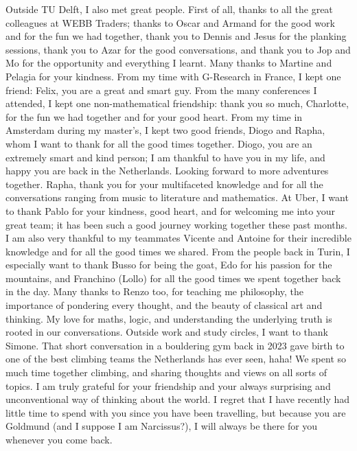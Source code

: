 Outside TU Delft, I also met great people. First of all, thanks to all the great colleagues at WEBB Traders; thanks to Oscar and Armand for the good work and for the fun we had together, thank you to Dennis and Jesus for the planking sessions, thank you to Azar for the good conversations, and thank you to Jop and Mo for the opportunity and everything I learnt. Many thanks to Martine and Pelagia for your kindness. From my time with G-Research in France, I kept one friend: Felix, you are a great and smart guy. From the many conferences I attended, I kept one non-mathematical friendship: thank you so much, Charlotte, for the fun we had together and for your good heart. From my time in Amsterdam during my master's, I kept two good friends, Diogo and Rapha, whom I want to thank for all the good times together. Diogo, you are an extremely smart and kind person; I am thankful to have you in my life, and happy you are back in the Netherlands. Looking forward to more adventures together. Rapha, thank you for your multifaceted knowledge and for all the conversations ranging from music to literature and mathematics. At Uber, I want to thank Pablo for your kindness, good heart, and for welcoming me into your great team; it has been such a good journey working together these past months. I am also very thankful to my teammates Vicente and Antoine for their incredible knowledge and for all the good times we shared. From the people back in Turin, I especially want to thank Busso for being the goat, Edo for his passion for the mountains, and Franchino (Lollo) for all the good times we spent together back in the day. Many thanks to Renzo too, for teaching me philosophy, the importance of pondering every thought, and the beauty of classical art and thinking. My love for maths, logic, and understanding the underlying truth is rooted in our conversations. Outside work and study circles, I want to thank Simone. That short conversation in a bouldering gym back in 2023 gave birth to one of the best climbing teams the Netherlands has ever seen, haha! We spent so much time together climbing, and sharing thoughts and views on all sorts of topics. I am truly grateful for your friendship and your always surprising and unconventional way of thinking about the world. I regret that I have recently had little time to spend with you since you have been travelling, but because you are Goldmund (and I suppose I am Narcissus?), I will always be there for you whenever you come back.

